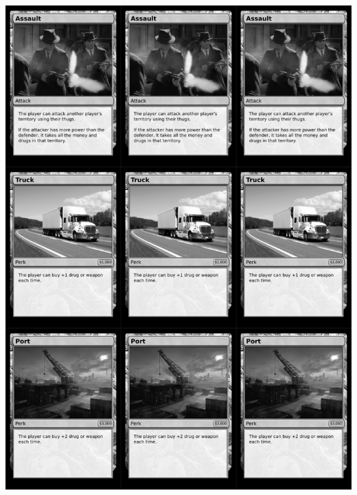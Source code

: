 \documentclass[a4paper]{article}
\begin{document}
\newpage

\begin{center}
	\centering
	\includegraphics[width=200.5mm,height=280.7mm]{output/temp/page28.png}
\end{center}
\end{document}
